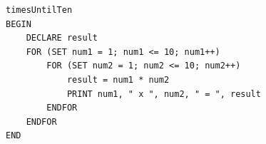 \documentclass[
  11pt,
  answers  
]{exam}
\begin{document}
\begin{questions}
\begin{solution}
    \end{solution}
    \pagebreak
    \question
    \begin{solution}
      \begin{lstlisting}
timesUntilTen
BEGIN
	DECLARE result
	FOR (SET num1 = 1; num1 <= 10; num1++)
		FOR (SET num2 = 1; num2 <= 10; num2++)
			result = num1 * num2
			PRINT num1, " x ", num2, " = ", result
		ENDFOR
	ENDFOR
END
      \end{lstlisting}
    \end{solution}
  \end{questions}
\end{document}
